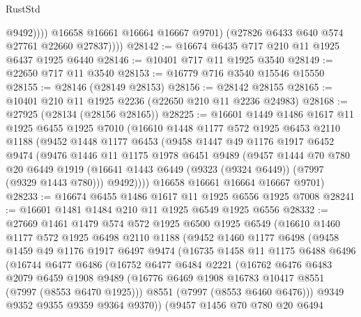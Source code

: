 \begin{lexlean}{RustStd}
\begin{coremodule}
                    @9492))))
            @16658
            @16661
            @16664
            @16667
            @9701)
          (@27826 @6433 @640 @574 @27761 @22660 @27837))))
@28142 := @16674 @6435 @717 @210 @11 @1925 @6437 @1925 @6440
@28146 := @10401 @717 @11 @1925 @3540
@28149 := @22650 @717 @11 @3540
@28153 := @16779 @716 @3540 @15546 @15550
@28155 := @28146 (@28149 @28153)
@28156 := @28142 @28155
@28165 := @10401 @210 @11 @1925 @2236 (@22650 @210 @11 @2236 @24983)
@28168 := @27925 (@28134 (@28156 @28165))
@28225 := @16601
    @1449
    @1486
    @1617
    @11
    @1925
    @6455
    @1925
    @7010
    (@16610
      @1448
      @1177
      @572
      @1925
      @6453
      @2110
      @1188
      (@9452
        @1448
        @1177
        @6453
        (@9458
          @1447
          @49
          @1176
          @1917
          @6452
          @9474
          (@9476
            @1446
            @11
            @1175
            @1978
            @6451
            @9489
            (@9457
              @1444
              @70
              @780
              @20
              @6449
              @1919
              (@16641 @1443 @6449 (@9323 (@9324 @6449)) (@7997 (@9329 @1443 @780)))
              @9492))))
      @16658
      @16661
      @16664
      @16667
      @9701)
@28233 := @16674 @6455 @1486 @1617 @11 @1925 @6556 @1925 @7008
@28241 := @16601 @1481 @1484 @210 @11 @1925 @6549 @1925 @6556
@28332 := @27669
    @1461
    @1479
    @574
    @572
    @1925
    @6500
    @1925
    @6549
    (@16610
      @1460
      @1177
      @572
      @1925
      @6498
      @2110
      @1188
      (@9452
        @1460
        @1177
        @6498
        (@9458
          @1459
          @49
          @1176
          @1917
          @6497
          @9474
          (@16735
            @1458
            @11
            @1175
            @6488
            @6496
            (@16744
              @6477
              @6486
              (@16752
                @6477
                @6484
                @2221
                (@16762
                  @6476
                  @6483
                  @2079
                  @6459
                  @1908
                  @9489
                  (@16776 @6469 @1908 @16783 @10417 @8551 (@7997 (@8553 @6470 @1925)))
                  @8551
                  (@7997 (@8553 @6460 @6476)))
                @9349
                @9352
                @9355
                @9359
                @9364
                @9370))
            (@9457
              @1456
              @70
              @780
              @20
              @6494

\end{coremodule}
\end{lexlean}
